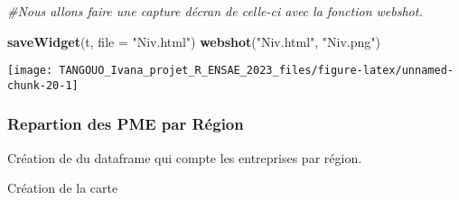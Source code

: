 \documentclass[
]{article}
\newenvironment{Shaded}{\begin{snugshade}}{\end{snugshade}}
\newcommand{\AttributeTok}[1]{\textcolor[rgb]{0.13,0.29,0.53}{#1}}
\newcommand{\CommentTok}[1]{\textcolor[rgb]{0.56,0.35,0.01}{\textit{#1}}}
\newcommand{\FunctionTok}[1]{\textcolor[rgb]{0.13,0.29,0.53}{\textbf{#1}}}
\newcommand{\NormalTok}[1]{#1}
\newcommand{\OtherTok}[1]{\textcolor[rgb]{0.56,0.35,0.01}{#1}}
\newcommand{\SpecialCharTok}[1]{\textcolor[rgb]{0.81,0.36,0.00}{\textbf{#1}}}
\newcommand{\StringTok}[1]{\textcolor[rgb]{0.31,0.60,0.02}{#1}}
\begin{document}
\begin{Shaded}
\begin{Highlighting}[]
\CommentTok{\#Nous  allons faire une capture d\textquotesingle{}écran de celle{-}ci avec la fonction webshot. }


\FunctionTok{saveWidget}\NormalTok{(t, }\AttributeTok{file =} \StringTok{"Niv.html"}\NormalTok{)}
\FunctionTok{webshot}\NormalTok{(}\StringTok{"Niv.html"}\NormalTok{, }\StringTok{"Niv.png"}\NormalTok{)}
\end{Highlighting}
\end{Shaded}

\begin{center}\texttt{[image: TANGOUO\_Ivana\_projet\_R\_ENSAE\_2023\_files/figure-latex/unnamed-chunk-20-1]} \end{center}

\hypertarget{repartion-des-pme-par-ruxe9gion}{%
\subsubsection{Repartion des PME par
Région}\label{repartion-des-pme-par-ruxe9gion}}

Création de du dataframe qui compte les entreprises par région.

\begin{Shaded}
\end{Shaded}

Création de la carte
\end{document}
